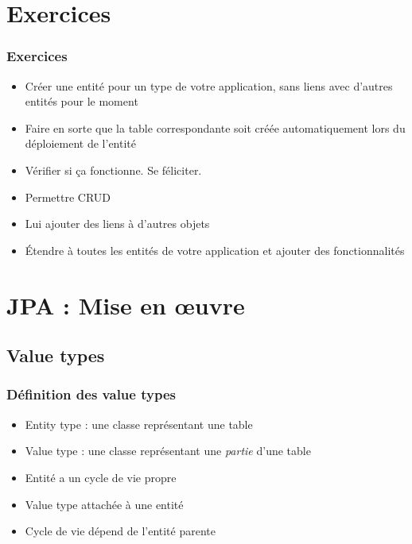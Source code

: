 \documentclass[english, french]{beamer}
\begin{document}
\section{Exercices}
\begin{frame}
	\frametitle{Exercices}
	\begin{itemize}
		\item Créer une entité pour un type de votre application, sans liens avec d’autres entités pour le moment
		\item Faire en sorte que la table correspondante soit créée automatiquement lors du déploiement de l’entité
		\item Vérifier si ça fonctionne. Se féliciter.
		\item Permettre CRUD
		\item Lui ajouter des liens à d’autres objets
		\item Étendre à toutes les entités de votre application et ajouter des fonctionnalités
	\end{itemize}
\end{frame}

\section{JPA : Mise en œuvre}
\subsection{Value types}
\begin{frame}
	\frametitle{Définition des value types}
	\begin{itemize}
		\item Entity type : une classe représentant une table
		\item Value type : une classe représentant une \emph{partie} d’une table
		\item Entité a un cycle de vie propre
		\item Value type attachée à une entité
		\item Cycle de vie dépend de l’entité parente
	\end{itemize}
\end{frame}
\end{document}
